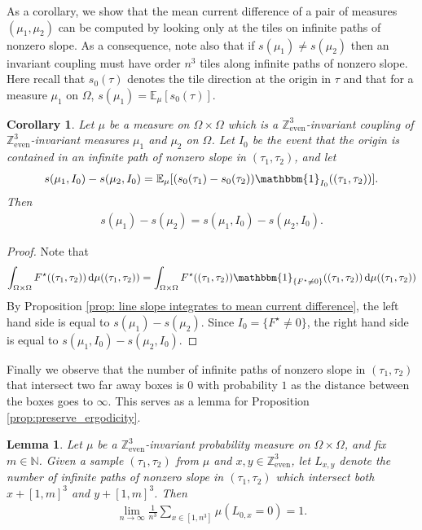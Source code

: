 \documentclass[11pt]{article}
\newtheorem{lemma}[thm]{Lemma}
\newtheorem{cor}[thm]{Corollary}
\theoremstyle{remark}
\theoremstyle{definition}
\newcommand{\Z}{\mathbb{Z}}
\newcommand{\threeeven}{\Z^3_{\text{even}}}
\newcommand{\m}[1]{\mathbb{#1}}
\newcommand{\dd}{\mathrm{d}}
\begin{document}
As a corollary, we show that the mean current difference of a pair of measures $(\mu_1,\mu_2)$ can be computed by looking only at the tiles on infinite paths of nonzero slope. As a consequence, note also that if $s(\mu_1)\neq s(\mu_2)$ then an invariant coupling must have order $n^3$ tiles along infinite paths of nonzero slope. Here recall that $s_0(\tau)$ denotes the tile direction at the origin in $\tau$ and that for a measure $\mu_1$ on $\Omega$, $s(\mu_1) = \m E_{\mu}[s_0(\tau)]$.
 \begin{cor}\label{cor:new 7.15}
     Let $\mu$ be a measure on $\Omega\times \Omega$ which is a $\threeeven$-invariant coupling of $\threeeven$-invariant measures $\mu_1$ and $\mu_2$ on $\Omega$. Let $I_0$ be the event that the origin is contained in an infinite path of nonzero slope in $(\tau_1,\tau_2)$, and let $$s(\mu_1,I_0)-s(\mu_2,I_0) = \m E_{\mu}[(s_0(\tau_1)-s_0(\tau_2))\mathbbm{1}_{I_0}((\tau_1,\tau_2))].$$ Then 
     \begin{align*}
         s(\mu_1)-s(\mu_2) = s(\mu_1,I_0)-s(\mu_2,I_0).
     \end{align*}
 \end{cor}
 \begin{proof}
     Note that 
     \begin{align*}
            \int_{\Omega\times \Omega} F^{\star}((\tau_1, \tau_2))\,\dd\mu((\tau_1, \tau_2)) = \int_{\Omega\times \Omega} F^{\star}((\tau_1, \tau_2))\mathbbm{1}_{\{F^\star\neq 0\}}((\tau_1,\tau_2))\,\dd\mu((\tau_1, \tau_2))
     \end{align*}
     By Proposition \ref{prop: line slope integrates to mean current difference}, the left hand side is equal to $s(\mu_1)-s(\mu_2)$. Since $I_0=\{F^{\star}\neq 0\}$, the right hand side is equal to $s(\mu_1,I_0)-s(\mu_2,I_0)$. 
 \end{proof}

Finally we observe that the number of infinite paths of nonzero slope in $(\tau_1,\tau_2)$ that intersect two far away boxes is $0$ with probability $1$ as the distance between the boxes goes to $\infty$. This serves as a lemma for Proposition \ref{prop:preserve_ergodicity}. 

\begin{lemma}\label{prop: infinite lines zero measure}
Let $\mu$ be a $\threeeven$-invariant probability measure on $\Omega\times \Omega$, and fix $m\in \mathbb N$. Given a sample $(\tau_1, \tau_2)$ from $\mu$ and $x,y\in \threeeven$, let $L_{x,y}$ denote the number of infinite paths of nonzero slope in $(\tau_1, \tau_2)$ which intersect both $x+ [1,m]^3$ and $y+[1,m]^3$. Then 
\begin{align*}
    \lim_{n\to \infty} \frac{1}{n^3} \sum_{x\in [1,n^3]} \mu( L_{0,x} = 0 ) = 1.
\end{align*}
\end{lemma}
\end{document}
